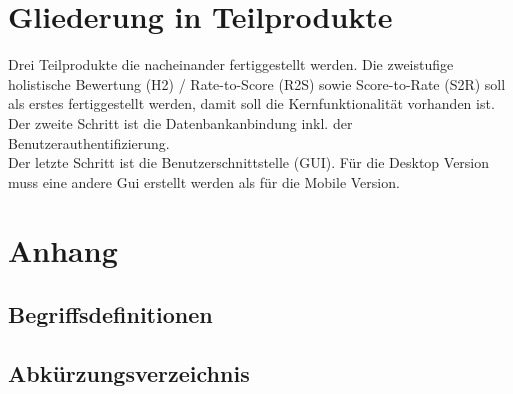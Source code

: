 \documentclass[a4paper,listof=leveldown,listof=numbered]{scrreprt}
\begin{document}
	
\chapter{Gliederung in Teilprodukte}
	Drei Teilprodukte die nacheinander fertiggestellt werden. Die zweistufige holistische Bewertung (H2) / Rate-to-Score (R2S) sowie Score-to-Rate (S2R) soll als erstes fertiggestellt werden, damit soll die Kernfunktionalität vorhanden ist. \\
	Der zweite Schritt ist die Datenbankanbindung inkl. der Benutzerauthentifizierung.\\
	Der letzte Schritt ist die Benutzerschnittstelle (GUI). Für die Desktop Version muss eine andere Gui erstellt werden als für die Mobile Version.


	
\chapter{Anhang}
\appendix
	\section{Begriffsdefinitionen}

	\section{Abkürzungsverzeichnis}
		\begin{acronym} 
		\end{acronym}
	
\end{document}
